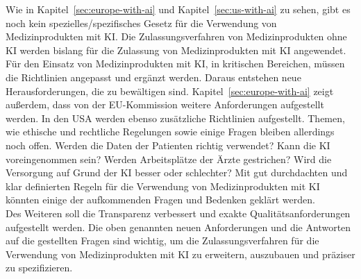 Wie in Kapitel~\ref{sec:europe-with-ai} und Kapitel~\ref{sec:us-with-ai} zu sehen,
gibt es noch kein spezielles/spezifisches Gesetz für die Verwendung von Medizinprodukten mit KI.
Die Zulassungsverfahren von Medizinprodukten ohne KI werden bislang für die Zulassung von Medizinprodukten mit KI angewendet.
Für den Einsatz von Medizinprodukten mit KI, in kritischen Bereichen, müssen die Richtlinien angepasst und ergänzt werden.
Daraus entstehen neue Herausforderungen, die zu bewältigen sind.
Kapitel~\ref{sec:europe-with-ai} zeigt außerdem, dass von der EU-Kommission weitere Anforderungen aufgestellt werden.
In den USA werden ebenso zusätzliche Richtlinien aufgestellt.
Themen, wie ethische und rechtliche Regelungen sowie einige Fragen bleiben allerdings noch offen.
Werden die Daten der Patienten richtig verwendet? Kann die KI voreingenommen sein?
Werden Arbeitsplätze der Ärzte gestrichen? 
Wird die Versorgung auf Grund der KI besser oder schlechter? 
Mit gut durchdachten und klar definierten Regeln für die Verwendung von Medizinprodukten mit KI könnten einige
der aufkommenden Fragen und Bedenken geklärt werden.\\
Des Weiteren soll die Transparenz verbessert und exakte Qualitätsanforderungen aufgestellt werden.
Die oben genannten neuen Anforderungen und die Antworten auf die gestellten Fragen sind wichtig, 
um die Zulassungsverfahren für die Verwendung von Medizinprodukten mit KI zu erweitern,
auszubauen und präziser zu spezifizieren.